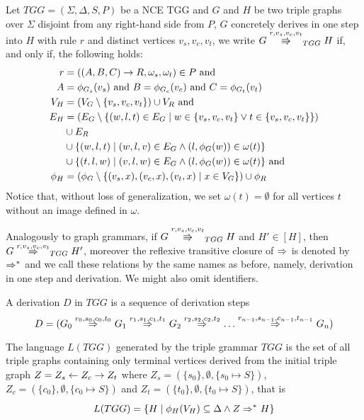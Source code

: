 \documentclass[]{report}
\begin{document}
\begin{definition}
	Let $TGG = (\Sigma, \Delta, S, P)$ be a NCE TGG and $G$ and $H$ be two triple graphs over $\Sigma$ disjoint from any right-hand side from $P$, $G$ concretely derives in one step into $H$ with rule $r$ and distinct vertices $v_s, v_c, v_t$, we write $G \tcderiv{r}{v_s,v_c,v_t}{TGG} H$ if, and only if, the following holds:
	\begin{align*}
	r & = ((A,B,C) \to R, \omega_s, \omega_t) \in P \text{ and } \\
	A & = \phi_{G_s}(v_s) \text{ and } B = \phi_{G_c}(v_c) \text{ and } C = \phi_{G_t}(v_t)\\
	V_H  & = (V_G \setminus \{v_s,v_c,v_t\}) \cup V_R \text{ and}\\
	E_H & = (E_G \setminus \{(w,l,t) \in E_G \; | \; w \in \{v_s,v_c,v_t\} \lor t \in \{v_s,v_c,v_t\} \})  \\
	& \cup E_R \\
	& \cup \{(w,l,t) \; | \; (w,l,v) \in E_G \land (l,\phi_G(w)) \in \omega(t)\} \\
	& \cup \{(t,l,w) \; | \; (v,l,w) \in E_G \land (l,\phi_G(w)) \in \omega(t)\} \text{ and} \\
	\phi_H & = (\phi_G \setminus \{(v_s,x),(v_c,x),(v_t,x) \; | \; x \in V_G\}) \cup \phi_R
	\end{align*}
	Notice that, without loss of generalization, we set $\omega(t) = \emptyset$ for all vertices $t$ without an image defined in $\omega$.
	
	Analogously to graph grammars, if $G \cderiv{r}{v_s,v_c,v_t}{TGG} H$ and $H' \in [H]$, then $G \tderiv{r}{v_s,v_c,v_t}{TGG} H'$, moreover the reflexive transitive closure of $\tderiv{}{}{}$ is denoted by $\tderivtr{}{}{}$ and we call these relations by the same names as before, namely, derivation in one step and derivation. We might also omit identifiers.
\end{definition}


\begin{definition}
	A derivation $D$ in $TGG$ is a sequence of derivation steps
	\[ 
	D = (G_0 \tderiv{r_0}{s_0,c_0,t_0}{} G_1 \tderiv{r_1}{s_1,c_1,t_1}{} G_2 \tderiv{r_2}{s_2,c_2,t_2}{} \dots \tderiv{r_{n-1}}{s_{n-1},c_{n-1},t_{n-1}}{} G_n)
	\]
\end{definition}

\begin{definition}
	The language $L(TGG)$ generated by the triple grammar $TGG$ is the set of all triple graphs containing only terminal vertices derived from the initial triple graph $Z = Z_s \overset{}{\leftarrow} Z_c \overset{}{\rightarrow} Z_t$ where $Z_s = (\{s_0\},\emptyset,\{s_0 \mapsto S\})$, $Z_c = (\{c_0\},\emptyset,\{c_0 \mapsto S\})$ and $Z_t = (\{t_0\},\emptyset,\{t_0 \mapsto S\})$, that is
	\[
	L(TGG) = \{H \st \phi_H(V_H) \subseteq \Delta \land Z \tderivtr{}{}{} H\}
	\]
\end{definition}
\end{document}
